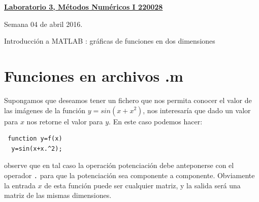 \documentclass[11pt]{article}
\begin{document}
\hspace*{-1,5cm}

\vspace*{0.5cm} \centerline {\bf\underline{Laboratorio 3, M\'etodos Num\'ericos I 220028 }}
\centerline{\textrm{Semana 04 de abril 2016.}}  \vspace{0.2cm}





\centerline{Introducci\'on  a MATLAB \circledR: gr\'aficas de funciones en dos dimensiones} 
%

\section{Funciones en archivos .m}
Supongamos que deseamos tener un fichero que nos permita conocer el valor de las im\'agenes de la funci\'on 
$y=sin(x+x^2)$, nos interesar\'ia que dado un valor para $x$ nos retorne el valor para $y$. En este caso podemos hacer:
\begin{verbatim}
 function y=f(x)
  y=sin(x+x.^2);
\end{verbatim}
observe que en tal caso la operaci\'on potenciaci\'on debe anteponerse con el operador \texttt{.} para que la 
potenciaci\'on sea componente a componente. Obviamente la entrada $x$ de esta funci\'on puede ser cualquier matriz, y 
la salida ser\'a una matriz de las mismas dimensiones.
\end{document}
